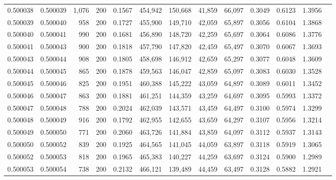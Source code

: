 \begin{tabular}{rrrrrrrrrrrrr}
0.500038 & 0.500039 &  1,076 & 200 &                                     0.1567 & 454,942 & 150,668 &  41,859 &  66,097 & 0.3049 & 0.6123 & 1.3956 \\
0.500039 & 0.500040 &    958 & 200 &                                     0.1727 & 455,900 & 149,710 &  42,059 &  65,897 & 0.3056 & 0.6104 & 1.3868 \\
0.500040 & 0.500041 &    990 & 200 &                                     0.1681 & 456,890 & 148,720 &  42,259 &  65,697 & 0.3064 & 0.6086 & 1.3776 \\
0.500041 & 0.500043 &    900 & 200 &                                     0.1818 & 457,790 & 147,820 &  42,459 &  65,497 & 0.3070 & 0.6067 & 1.3693 \\
0.500043 & 0.500044 &    908 & 200 &                                     0.1805 & 458,698 & 146,912 &  42,659 &  65,297 & 0.3077 & 0.6048 & 1.3609 \\
0.500044 & 0.500045 &    865 & 200 &                                     0.1878 & 459,563 & 146,047 &  42,859 &  65,097 & 0.3083 & 0.6030 & 1.3528 \\
0.500045 & 0.500046 &    825 & 200 &                                     0.1951 & 460,388 & 145,222 &  43,059 &  64,897 & 0.3089 & 0.6011 & 1.3452 \\
0.500046 & 0.500047 &    863 & 200 &                                     0.1881 & 461,251 & 144,359 &  43,259 &  64,697 & 0.3095 & 0.5993 & 1.3372 \\
0.500047 & 0.500048 &    788 & 200 &                                     0.2024 & 462,039 & 143,571 &  43,459 &  64,497 & 0.3100 & 0.5974 & 1.3299 \\
0.500048 & 0.500049 &    916 & 200 &                                     0.1792 & 462,955 & 142,655 &  43,659 &  64,297 & 0.3107 & 0.5956 & 1.3214 \\
0.500049 & 0.500050 &    771 & 200 &                                     0.2060 & 463,726 & 141,884 &  43,859 &  64,097 & 0.3112 & 0.5937 & 1.3143 \\
0.500050 & 0.500052 &    839 & 200 &                                     0.1925 & 464,565 & 141,045 &  44,059 &  63,897 & 0.3118 & 0.5919 & 1.3065 \\
0.500052 & 0.500053 &    818 & 200 &                                     0.1965 & 465,383 & 140,227 &  44,259 &  63,697 & 0.3124 & 0.5900 & 1.2989 \\
0.500053 & 0.500054 &    738 & 200 &                                     0.2132 & 466,121 & 139,489 &  44,459 &  63,497 & 0.3128 & 0.5882 & 1.2921 \\

\end{tabular}

